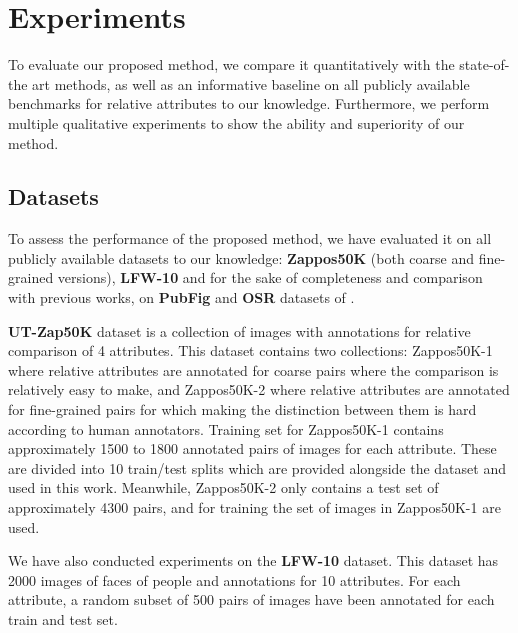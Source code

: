 

\section{Experiments}\label{sec.4}

To evaluate our proposed method, we compare it quantitatively with the state-of-the art methods, as well as an informative baseline on all publicly available benchmarks for relative attributes to our knowledge. Furthermore, we perform multiple qualitative experiments to show the ability and superiority of our method.

\subsection{Datasets}\label{sec.4.1}

To assess the performance of the proposed method, we have evaluated it on all publicly available datasets to our knowledge: \textbf{Zappos50K} \cite{Yu2014} (both coarse and fine-grained versions), \textbf{LFW-10} \cite{Sandeep_2014_CVPR} and for the sake of completeness and comparison with previous works, on \textbf{PubFig} and \textbf{OSR} datasets of \cite{parikh2011}.

\textbf{UT-Zap50K} \cite{Yu2014} dataset is a collection of images with annotations for relative comparison of 4 attributes. This dataset contains two collections: Zappos50K-1 where relative attributes are annotated for coarse pairs where the comparison is relatively easy to make, and Zappos50K-2 where relative attributes are annotated for fine-grained pairs for which making the distinction between them is hard according to human annotators.
Training set for Zappos50K-1 contains approximately 1500 to 1800 annotated pairs of images for each attribute. These are divided into 10 train/test splits which are provided alongside the dataset and used in this work. Meanwhile, Zappos50K-2 only contains a test set of approximately 4300 pairs, and for training the set of images in Zappos50K-1 are used.

We have also conducted experiments on the \textbf{LFW-10} \cite{Sandeep_2014_CVPR} dataset. This dataset has 2000 images of faces of people and annotations for 10 attributes. For each attribute, a random subset of 500 pairs of images have been annotated for each train and test set.

